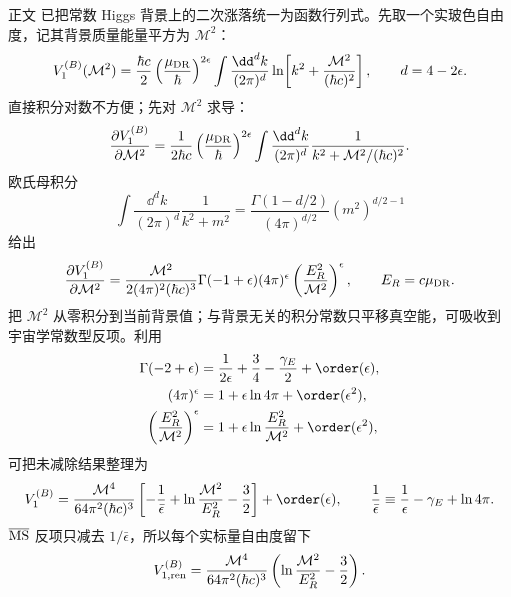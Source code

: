 \begin{derivation}
正文 已把常数 Higgs 背景上的二次涨落统一为函数行列式。先取一个实玻色自由度，记其背景质量能量平方为 $\mathcal M^2$：
\begin{equation*}
 V_1^{(B)}(\mathcal M^2)
 =\frac{\hbar c}{2}
 \left(\frac{\mu_{\rm DR}}{\hbar}\right)^{2\epsilon}
 \int\frac{\dd^dk}{(2\pi)^d}
 \ln\!\left[k^2+\frac{\mathcal M^2}{(\hbar c)^2}\right],
 \qquad d=4-2\epsilon.
\end{equation*}
直接积分对数不方便；先对 $\mathcal M^2$ 求导：
\begin{equation*}
 \frac{\partial V_1^{(B)}}{\partial\mathcal M^2}
 =\frac{1}{2\hbar c}
 \left(\frac{\mu_{\rm DR}}{\hbar}\right)^{2\epsilon}
 \int\frac{\dd^dk}{(2\pi)^d}
 \frac{1}{k^2+\mathcal M^2/(\hbar c)^2}.
\end{equation*}
欧氏母积分
\begin{equation*}
 \int\frac{\dd^dk}{(2\pi)^d}\frac1{k^2+m^2}
 =\frac{\Gamma(1-d/2)}{(4\pi)^{d/2}}(m^2)^{d/2-1}
\end{equation*}
给出
\begin{equation*}
 \frac{\partial V_1^{(B)}}{\partial\mathcal M^2}
 =\frac{\mathcal M^2}{2(4\pi)^2(\hbar c)^3}
 \Gamma(-1+\epsilon)(4\pi)^\epsilon
 \left(\frac{E_R^2}{\mathcal M^2}\right)^\epsilon,
 \qquad E_R=c\mu_{\rm DR}.
\end{equation*}
把 $\mathcal M^2$ 从零积分到当前背景值；与背景无关的积分常数只平移真空能，可吸收到宇宙学常数型反项。利用
\begin{align*}
 \Gamma(-2+\epsilon)
 &=\frac1{2\epsilon}+\frac34-\frac{\gamma_E}{2}+\order(\epsilon),\\
 (4\pi)^\epsilon
 &=1+\epsilon\ln4\pi+\order(\epsilon^2),\\
 \left(\frac{E_R^2}{\mathcal M^2}\right)^\epsilon
 &=1+\epsilon\ln\frac{E_R^2}{\mathcal M^2}+\order(\epsilon^2),
\end{align*}
可把未减除结果整理为
\begin{equation*}
 V_1^{(B)}
 =\frac{\mathcal M^4}{64\pi^2(\hbar c)^3}
 \left[
 -\frac1{\bar\epsilon}
 +\ln\frac{\mathcal M^2}{E_R^2}-\frac32
 \right]+\order(\epsilon),
 \qquad
 \frac1{\bar\epsilon}\equiv\frac1\epsilon-\gamma_E+\ln4\pi.
\end{equation*}
$\overline{\rm MS}$ 反项只减去 $1/\bar\epsilon$，所以每个实标量自由度留下
\begin{equation*}
 V_{1,\rm ren}^{(B)}
 =\frac{\mathcal M^4}{64\pi^2(\hbar c)^3}
 \left(\ln\frac{\mathcal M^2}{E_R^2}-\frac32\right).
\end{equation*}


\end{derivation}
